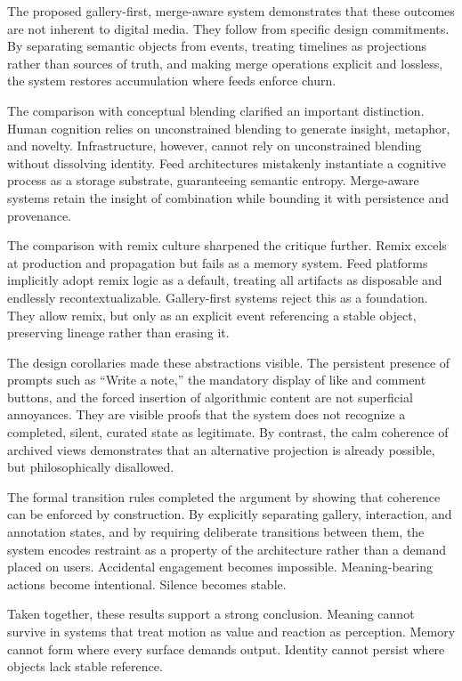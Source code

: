 \documentclass[11pt,oneside]{article}
\begin{document}
The proposed gallery-first, merge-aware system demonstrates that these outcomes are not inherent to digital media. They follow from specific design commitments. By separating semantic objects from events, treating timelines as projections rather than sources of truth, and making merge operations explicit and lossless, the system restores accumulation where feeds enforce churn.

The comparison with conceptual blending clarified an important distinction. Human cognition relies on unconstrained blending to generate insight, metaphor, and novelty. Infrastructure, however, cannot rely on unconstrained blending without dissolving identity. Feed architectures mistakenly instantiate a cognitive process as a storage substrate, guaranteeing semantic entropy. Merge-aware systems retain the insight of combination while bounding it with persistence and provenance.

The comparison with remix culture sharpened the critique further. Remix excels at production and propagation but fails as a memory system. Feed platforms implicitly adopt remix logic as a default, treating all artifacts as disposable and endlessly recontextualizable. Gallery-first systems reject this as a foundation. They allow remix, but only as an explicit event referencing a stable object, preserving lineage rather than erasing it.

The design corollaries made these abstractions visible. The persistent presence of prompts such as “Write a note,” the mandatory display of like and comment buttons, and the forced insertion of algorithmic content are not superficial annoyances. They are visible proofs that the system does not recognize a completed, silent, curated state as legitimate. By contrast, the calm coherence of archived views demonstrates that an alternative projection is already possible, but philosophically disallowed.

The formal transition rules completed the argument by showing that coherence can be enforced by construction. By explicitly separating gallery, interaction, and annotation states, and by requiring deliberate transitions between them, the system encodes restraint as a property of the architecture rather than a demand placed on users. Accidental engagement becomes impossible. Meaning-bearing actions become intentional. Silence becomes stable.

Taken together, these results support a strong conclusion. Meaning cannot survive in systems that treat motion as value and reaction as perception. Memory cannot form where every surface demands output. Identity cannot persist where objects lack stable reference.
\end{document}
